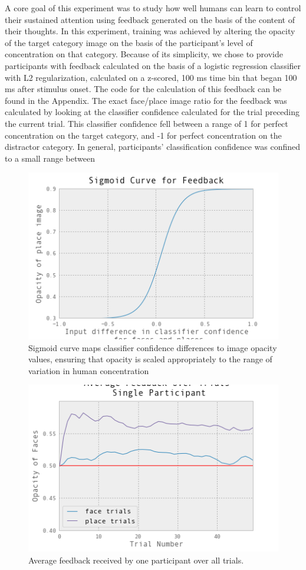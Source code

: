 \documentclass[11pt]{report}
\begin{document}
A core goal of this experiment was to study how well humans can learn to control their sustained attention using feedback generated on the basis of the content of their thoughts.  In this experiment, training was achieved by altering the opacity of the target category image on the basis of the participant's level of concentration on that category.  Because of its simplicity, we chose to provide participants with feedback calculated on the basis of a logistic regression classifier with L2 regularization, calculated on a z-scored, 100 ms time bin that began 100 ms after stimulus onset.  The code for the calculation of this feedback can be found in the Appendix.  The exact face/place image ratio for the feedback was calculated by looking at the classifier confidence calculated for the trial preceding the current trial.  This classifier confidence fell between a range of 1 for perfect concentration on the target category, and -1 for perfect concentration on the distractor category.  In general, participants' classification confidence was confined to a small range between 

\begin{figure}[t]
\centering
\includegraphics[width=5in]{sigmoidcurve}
\caption{Sigmoid curve maps classifier confidence differences to image opacity values, ensuring that opacity is scaled appropriately to the range of variation in human concentration\label{sigmoid}}
\end{figure}

\begin{figure}[t]
\centering
\includegraphics[width=5in]{average_feedback_trial}
\caption{Average feedback received by one participant over all trials.\label{avgfeedbacktrial}}
\end{figure}
  
{}

\end{document}
